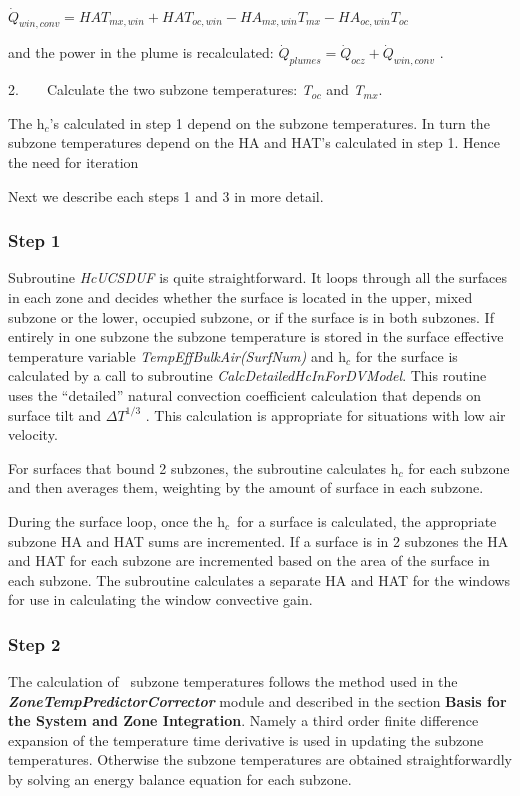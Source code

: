 ~~~~~~~~~~~~~~~~~~~~~~~~~~~~~ \({\dot Q_{win,conv}} = HA{T_{mx,win}} + HA{T_{oc,win}} - H{A_{mx,win}}{T_{mx}} - H{A_{oc,win}}{T_{oc}}\)

and the power in the plume is recalculated: \({\dot Q_{plumes}} = {\dot Q_{ocz}} + {\dot Q_{win,conv}}\) .

2.~~~~Calculate the two subzone temperatures: \emph{T\(_{oc}\)} and \emph{T\(_{mx}\)}.

The h\(_{c}\)'s calculated in step 1 depend on the subzone temperatures. In turn the subzone temperatures depend on the HA and HAT's calculated in step 1. Hence the need for iteration

Next we describe each steps 1 and 3 in more detail.

\subsubsection{Step 1}\label{step-1-2}

Subroutine \emph{HcUCSDUF} is quite straightforward. It loops through all the surfaces in each zone and decides whether the surface is located in the upper, mixed subzone or the lower, occupied subzone, or if the surface is in both subzones. If entirely in one subzone the subzone temperature is stored in the surface effective temperature variable \emph{TempEffBulkAir(SurfNum)} and h\(_{c}\) for the surface is calculated by a call to subroutine \emph{CalcDetailedHcInForDVModel}. This routine uses the ``detailed'' natural convection coefficient calculation that depends on surface tilt and \(\Delta {T^{1/3}}\) . This calculation is appropriate for situations with low air velocity.

For surfaces that bound 2 subzones, the subroutine calculates h\(_{c}\) for each subzone and then averages them, weighting by the amount of surface in each subzone.

During the surface loop, once the h\(_{c}\)~for a surface is calculated, the appropriate subzone HA and HAT sums are incremented. If a surface is in 2 subzones the HA and HAT for each subzone are incremented based on the area of the surface in each subzone. The subroutine calculates a separate HA and HAT for the windows for use in calculating the window convective gain.

\subsubsection{Step 2}\label{step-2-1}

The calculation of~ subzone temperatures follows the method used in the \textbf{\emph{ZoneTempPredictorCorrector}} module and described in the section \textbf{Basis for the System and Zone Integration}. Namely a third order finite difference expansion of the temperature time derivative is used in updating the subzone temperatures. Otherwise the subzone temperatures are obtained straightforwardly by solving an energy balance equation for each subzone.

